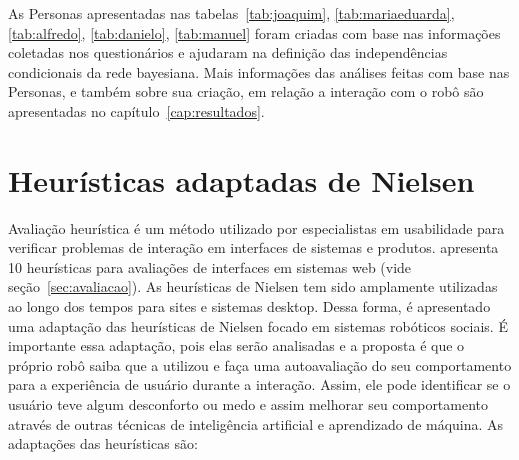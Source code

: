 As Personas apresentadas nas tabelas~\ref{tab:joaquim}, \ref{tab:mariaeduarda}, \ref{tab:alfredo}, \ref{tab:danielo}, \ref{tab:manuel} foram criadas com base nas informações coletadas nos questionários e ajudaram na definição das independências condicionais da rede bayesiana. Mais informações das análises feitas com base nas Personas, e também sobre sua criação, em relação a interação com o robô são apresentadas no capítulo~\ref{cap:resultados}.

\section{Heurísticas adaptadas de Nielsen} %
\label{sec:heuristicas}
Avaliação heurística é um método utilizado por especialistas em usabilidade para verificar problemas de interação em interfaces de sistemas e produtos.  apresenta 10 heurísticas para avaliações de interfaces em sistemas web (vide seção~\ref{sec:avaliacao}). As heurísticas de Nielsen tem sido amplamente utilizadas ao longo dos tempos para sites e sistemas desktop. Dessa forma, é apresentado uma adaptação das heurísticas de Nielsen focado em sistemas robóticos sociais. É importante essa adaptação, pois elas serão analisadas e a proposta é que o próprio robô saiba que a utilizou e faça uma  autoavaliação do seu comportamento para a experiência de usuário durante a interação. Assim, ele pode identificar se o usuário teve algum desconforto ou medo e assim melhorar seu comportamento através de outras técnicas de inteligência artificial e aprendizado de máquina. As adaptações das heurísticas são:

